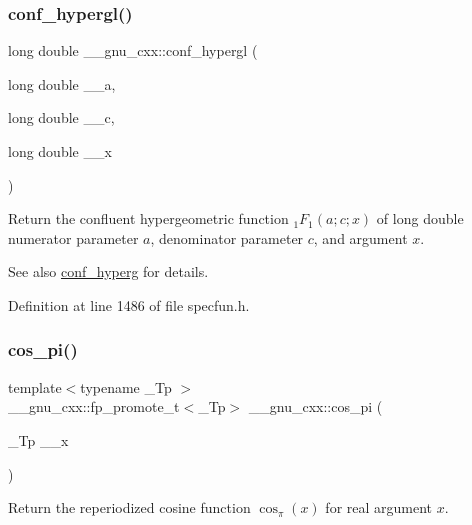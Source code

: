 \subsubsection{\texorpdfstring{conf\+\_\+hypergl()}{conf\_hypergl()}}
{\footnotesize\ttfamily long double \+\_\+\+\_\+gnu\+\_\+cxx\+::conf\+\_\+hypergl (\begin{DoxyParamCaption}\item[{long double}]{\+\_\+\+\_\+a,  }\item[{long double}]{\+\_\+\+\_\+c,  }\item[{long double}]{\+\_\+\+\_\+x }\end{DoxyParamCaption})\hspace{0.3cm}{\ttfamily [inline]}}

Return the confluent hypergeometric function $ {}_1F_1(a;c;x) $ of {\ttfamily long double} numerator parameter $ a $, denominator parameter $ c $, and argument $ x $.

\begin{DoxySeeAlso}{See also}
\hyperlink{group__gnu__math__spec__func_ga4d01e85e7d295afca5d9f8b6c68f19cc}{conf\+\_\+hyperg} for details. 
\end{DoxySeeAlso}


Definition at line 1486 of file specfun.\+h.

\mbox{\label{group__gnu__math__spec__func_gafc4698ae591b0e9e61285b0794d43ef4}} 
\subsubsection{\texorpdfstring{cos\+\_\+pi()}{cos\_pi()}}
{\footnotesize\ttfamily template$<$typename \+\_\+\+Tp $>$ \\
\+\_\+\+\_\+gnu\+\_\+cxx\+::fp\+\_\+promote\+\_\+t$<$\+\_\+\+Tp$>$ \+\_\+\+\_\+gnu\+\_\+cxx\+::cos\+\_\+pi (\begin{DoxyParamCaption}\item[{\+\_\+\+Tp}]{\+\_\+\+\_\+x }\end{DoxyParamCaption})\hspace{0.3cm}{\ttfamily [inline]}}

Return the reperiodized cosine function $ \cos_\pi(x) $ for real argument $ x $.


